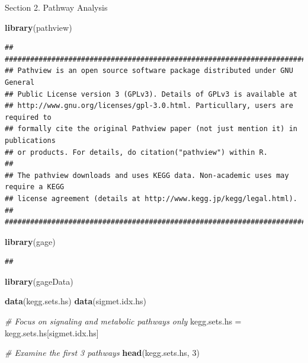 \documentclass[
]{article}
\newenvironment{Shaded}{\begin{snugshade}}{\end{snugshade}}
\newcommand{\CommentTok}[1]{\textcolor[rgb]{0.56,0.35,0.01}{\textit{#1}}}
\newcommand{\DecValTok}[1]{\textcolor[rgb]{0.00,0.00,0.81}{#1}}
\newcommand{\FunctionTok}[1]{\textcolor[rgb]{0.13,0.29,0.53}{\textbf{#1}}}
\newcommand{\NormalTok}[1]{#1}
\newcommand{\OtherTok}[1]{\textcolor[rgb]{0.56,0.35,0.01}{#1}}
\begin{document}
Section 2. Pathway Analysis

\begin{Shaded}
\begin{Highlighting}[]
\FunctionTok{library}\NormalTok{(pathview)}
\end{Highlighting}
\end{Shaded}

\begin{verbatim}
## ##############################################################################
## Pathview is an open source software package distributed under GNU General
## Public License version 3 (GPLv3). Details of GPLv3 is available at
## http://www.gnu.org/licenses/gpl-3.0.html. Particullary, users are required to
## formally cite the original Pathview paper (not just mention it) in publications
## or products. For details, do citation("pathview") within R.
## 
## The pathview downloads and uses KEGG data. Non-academic uses may require a KEGG
## license agreement (details at http://www.kegg.jp/kegg/legal.html).
## ##############################################################################
\end{verbatim}

\begin{Shaded}
\begin{Highlighting}[]
\FunctionTok{library}\NormalTok{(gage)}
\end{Highlighting}
\end{Shaded}

\begin{verbatim}
## 
\end{verbatim}

\begin{Shaded}
\begin{Highlighting}[]
\FunctionTok{library}\NormalTok{(gageData)}

\FunctionTok{data}\NormalTok{(kegg.sets.hs)}
\FunctionTok{data}\NormalTok{(sigmet.idx.hs)}

\CommentTok{\# Focus on signaling and metabolic pathways only}
\NormalTok{kegg.sets.hs }\OtherTok{=}\NormalTok{ kegg.sets.hs[sigmet.idx.hs]}

\CommentTok{\# Examine the first 3 pathways}
\FunctionTok{head}\NormalTok{(kegg.sets.hs, }\DecValTok{3}\NormalTok{)}
\end{Highlighting}
\end{Shaded}
\end{document}
